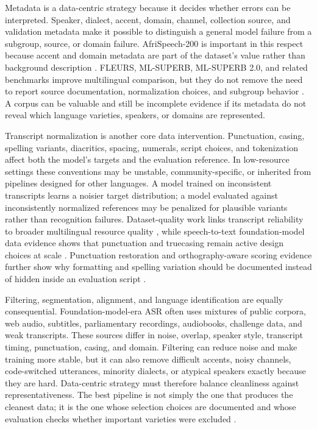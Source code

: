 \documentclass[pdflatex,sn-basic]{sn-jnl}
\theoremstyle{thmstyleone}
\theoremstyle{thmstyletwo}
\theoremstyle{thmstylethree}
\begin{document}
Metadata is a data-centric strategy because it decides whether errors can be interpreted. Speaker, dialect, accent, domain, channel, collection source, and validation metadata make it possible to distinguish a general model failure from a subgroup, source, or domain failure. AfriSpeech-200 is important in this respect because accent and domain metadata are part of the dataset's value rather than background description \citep{olatunji2023_afrispeech200}. FLEURS, ML-SUPERB, ML-SUPERB 2.0, and related benchmarks improve multilingual comparison, but they do not remove the need to report source documentation, normalization choices, and subgroup behavior \citep{conneau2022fleurs,shi2023mlsuperb,shi2024mlsuperb2,chen2025mlsuperb2challenge}. A corpus can be valuable and still be incomplete evidence if its metadata do not reveal which language varieties, speakers, or domains are represented.

Transcript normalization is another core data intervention. Punctuation, casing, spelling variants, diacritics, spacing, numerals, script choices, and tokenization affect both the model's targets and the evaluation reference. In low-resource settings these conventions may be unstable, community-specific, or inherited from pipelines designed for other languages. A model trained on inconsistent transcripts learns a noisier target distribution; a model evaluated against inconsistently normalized references may be penalized for plausible variants rather than recognition failures. Dataset-quality work links transcript reliability to broader multilingual resource quality \citep{lau2025_data_quality_multilingual_speech}, while speech-to-text foundation-model data evidence shows that punctuation and truecasing remain active design choices at scale \citep{tian24_interspeech}. Punctuation restoration and orthography-aware scoring evidence further show why formatting and spelling variation should be documented instead of hidden inside an evaluation script \citep{chen21d_interspeech,karita2023lenient}.

Filtering, segmentation, alignment, and language identification are equally consequential. Foundation-model-era ASR often uses mixtures of public corpora, web audio, subtitles, parliamentary recordings, audiobooks, challenge data, and weak transcripts. These sources differ in noise, overlap, speaker style, transcript timing, punctuation, casing, and domain. Filtering can reduce noise and make training more stable, but it can also remove difficult accents, noisy channels, code-switched utterances, minority dialects, or atypical speakers exactly because they are hard. Data-centric strategy must therefore balance cleanliness against representativeness. The best pipeline is not simply the one that produces the cleanest data; it is the one whose selection choices are documented and whose evaluation checks whether important varieties were excluded \citep{wang2021voxpopuli,tian24_interspeech}.
\end{document}
